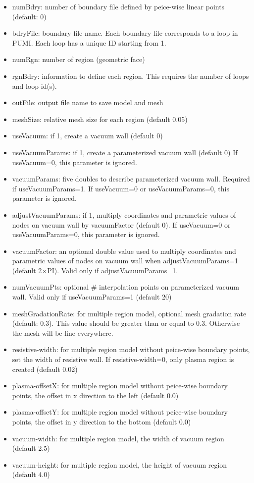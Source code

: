 \begin{itemize}
\item numBdry: number of boundary file defined by peice-wise linear points (default: 0)
\item bdryFile: boundary file name. Each boundary file corresponds to a loop in PUMI. Each loop has a unique ID starting from 1.
\item numRgn: number of region (geometric face)
\item rgnBdry: information to define each region. This requires the number of loops and loop id(s).
\item outFile: output file name to save model and mesh
\item meshSize: relative mesh size for each region (default 0.05)
\item useVacuum: if 1, create a vacuum wall (default 0)
\item useVacuumParams: if 1, create a parameterized vacuum wall (default 0)
If useVacuum=0, this parameter is ignored.
\item vacuumParams: five doubles to describe parameterized vacuum wall. Required if useVacuumParams=1.
If useVacuum=0 or useVacuumParams=0, this parameter is ignored. 
\item adjustVacuumParams: if 1, multiply coordinates and parametric values of nodes on vacuum wall by vacuumFactor (default 0). If useVacuum=0 or useVacuumParams=0, this parameter is ignored.
\item vacuumFactor: an optional double value used to multiply coordinates and parametric values of nodes on vacuum wall when adjustVacuumParams=1 (default 2$\times$PI). Valid only if adjustVacuumParams=1.
\item numVacuumPts: optional \# interpolation points on parameterized vacuum wall. Valid only if useVacuumParams=1 (default 20)
\item meshGradationRate: for multiple region model, optional mesh gradation rate (default: 0.3). This value should be greater than or equal to 0.3. Otherwise the mesh will be fine everywhere.
\item resistive-width: for multiple region model without peice-wise boundary points, set the width of resistive wall. If resistive-width=0, only plasma region is created (default 0.02)
\item plasma-offsetX: for multiple region model without peice-wise boundary points, the offset in x direction to the left (default 0.0)
\item plasma-offsetY: for multiple region model without peice-wise boundary points, the offset in y direction to the bottom (default 0.0)
\item vacuum-width: for multiple region model, the width of vacuum region (default 2.5)
\item vacuum-height: for multiple region model, the height of vacuum region (default 4.0) 
\end{itemize}

